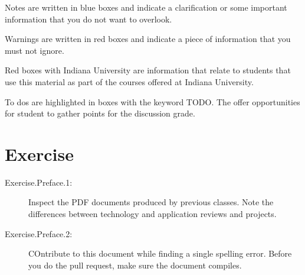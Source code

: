 \begin{NOTE}
Notes are written in blue boxes and indicate a clarification or some
important information that you do not want to overlook.
\end{NOTE}

\begin{WARNING}
Warnings are written in red  boxes and indicate a piece of information
that you must not ignore.
\end{WARNING}

\begin{IU}
Red boxes with Indiana University are information that relate to
students that use this material as part of the courses offered at
Indiana University.
\end{IU}

To dos are highlighted in boxes with the keyword TODO. The offer
opportunities for student to gather points for the discussion grade.


\section{Exercise}

\begin{description}
\item[Exercise.Preface.1:] Inspect the PDF documents produced by previous
classes. Note the differences between technology and application
reviews and projects. 
\item[Exercise.Preface.2:] COntribute to this document while finding a
  single spelling error. Before you do the pull request, make sure the
  document compiles.
\end{description}


